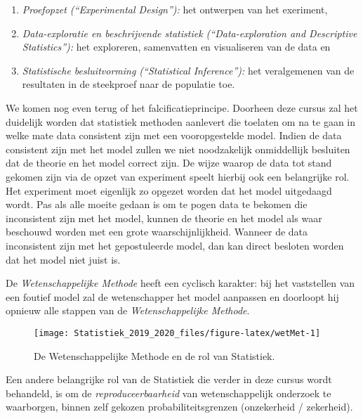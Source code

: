 \documentclass[12pt,dutch,coursenotes]{book}
\providecommand{\tightlist}{%
  \setlength{\itemsep}{0pt}\setlength{\parskip}{0pt}}
\theoremstyle{definition}
\theoremstyle{definition}
\theoremstyle{definition}
\theoremstyle{remark}
\begin{document}
\begin{itemize}
  \begin{enumerate}
  \def\labelenumi{\arabic{enumi}.}
  \tightlist
  \item
    \emph{Proefopzet (``Experimental Design''):} het ontwerpen van het
    exeriment,
  \item
    \emph{Data-exploratie en beschrijvende statistiek
    (``Data-exploration and Descriptive Statistics''):} het exploreren,
    samenvatten en visualiseren van de data en
  \item
    \emph{Statistische besluitvorming (``Statistical Inference''):} het
    veralgemenen van de resultaten in de steekproef naar de populatie
    toe.
  \end{enumerate}
\end{itemize}

We komen nog even terug of het falcificatieprincipe. Doorheen deze
cursus zal het duidelijk worden dat statistiek methoden aanlevert die
toelaten om na te gaan in welke mate data consistent zijn met een
vooropgestelde model. Indien de data consistent zijn met het model
zullen we niet noodzakelijk onmiddellijk besluiten dat de theorie en het
model correct zijn. De wijze waarop de data tot stand gekomen zijn via
de opzet van experiment speelt hierbij ook een belangrijke rol. Het
experiment moet eigenlijk zo opgezet worden dat het model uitgedaagd
wordt. Pas als alle moeite gedaan is om te pogen data te bekomen die
inconsistent zijn met het model, kunnen de theorie en het model als waar
beschouwd worden met een grote waarschijnlijkheid. Wanneer de data
inconsistent zijn met het gepostuleerde model, dan kan direct besloten
worden dat het model niet juist is.

De \emph{Wetenschappelijke Methode} heeft een cyclisch karakter: bij het
vaststellen van een foutief model zal de wetenschapper het model
aanpassen en doorloopt hij opnieuw alle stappen van de
\emph{Wetenschappelijke Methode}.

\begin{figure}

{\centering \texttt{[image: Statistiek\_2019\_2020\_files/figure-latex/wetMet-1]} 

}

\caption{De Wetenschappelijke Methode en de rol van Statistiek.}\label{fig:wetMet}
\end{figure}

Een andere belangrijke rol van de Statistiek die verder in deze cursus
wordt behandeld, is om de \emph{reproduceerbaarheid} van
wetenschappelijk onderzoek te waarborgen, binnen zelf gekozen
probabiliteitsgrenzen (onzekerheid / zekerheid).
\end{document}
